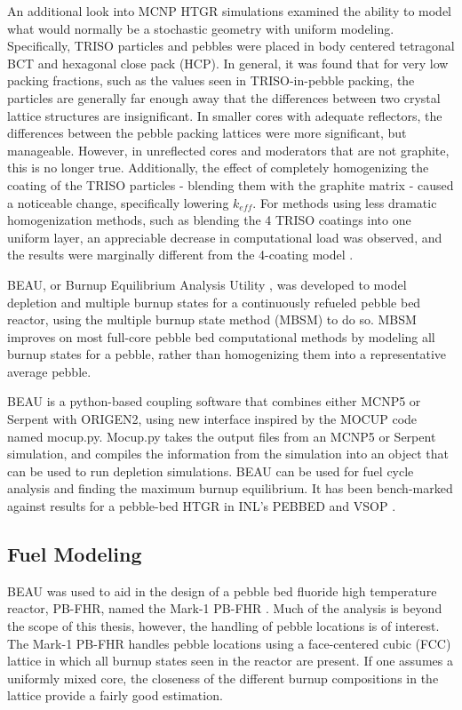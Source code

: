 An additional look into MCNP HTGR simulations examined the ability to model what would normally be a stochastic geometry with uniform modeling.  Specifically, TRISO particles and pebbles were placed in body centered tetragonal BCT and hexagonal close pack (HCP).  In general, it was found that for very low packing fractions, such as the values seen in TRISO-in-pebble packing, the particles are generally far enough away that the differences between two crystal lattice structures are insignificant.  In smaller cores with adequate reflectors, the differences between the pebble packing lattices were more significant, but manageable.  However, in unreflected cores and moderators that are not graphite, this is no longer true.  Additionally, the effect of completely homogenizing the coating of the TRISO particles - blending them with the graphite matrix - caused a noticeable change, specifically lowering $k_{eff}$.  For methods using less dramatic homogenization methods, such as blending the 4 TRISO coatings into one uniform layer, an appreciable decrease in computational load was observed, and the results were marginally different from the 4-coating model \cite{karriem_mcnp_2001}.

BEAU, or Burnup Equilibrium Analysis Utility \cite{cisneros_pebble_2013}, was developed to model depletion and multiple burnup states for a continuously refueled pebble bed reactor, using the multiple burnup state method (MBSM) to do so.  MBSM improves on most full-core pebble bed computational methods by modeling all burnup states for a pebble, rather than homogenizing them into a representative average pebble.

BEAU is a python-based coupling software that combines either MCNP5 or Serpent with ORIGEN2, using new interface inspired by the MOCUP code named mocup.py.  Mocup.py takes the output files from an MCNP5 or Serpent simulation, and compiles the information from the simulation into an object that can be used to run depletion simulations.  BEAU can be used for fuel cycle analysis and finding the maximum burnup equilibrium.  It has been bench-marked against results for a pebble-bed HTGR in INL's PEBBED and VSOP \cite{cisneros_pebble_2013}.

\subsection{Fuel Modeling}

BEAU was used to aid in the design of a pebble bed fluoride high temperature reactor, PB-FHR, named the Mark-1 PB-FHR \cite{cisneros_pebble_2013}.  Much of the analysis is beyond the scope of this thesis, however, the handling of pebble locations is of interest.  The Mark-1 PB-FHR handles pebble locations using a face-centered cubic (FCC) lattice in which all burnup states seen in the reactor are present.  If one assumes a uniformly mixed core, the closeness of the different burnup compositions in the lattice provide a fairly good estimation.


